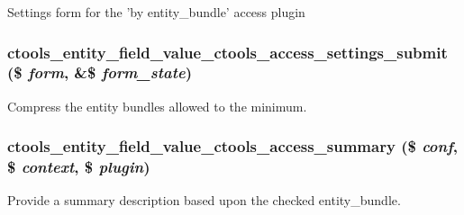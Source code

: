 \label{entity__field__value_8inc_a6de8332631f237ef4baaacc10ce923fc}
Settings form for the 'by entity\_\-bundle' access plugin \hypertarget{entity__field__value_8inc_a8af33147764d3a5269cf91065f0ad712}{
\subsubsection[{ctools\_\-entity\_\-field\_\-value\_\-ctools\_\-access\_\-settings\_\-submit}]{\setlength{\rightskip}{0pt plus 5cm}ctools\_\-entity\_\-field\_\-value\_\-ctools\_\-access\_\-settings\_\-submit (\$ {\em form}, \/  \&\$ {\em form\_\-state})}}
\label{entity__field__value_8inc_a8af33147764d3a5269cf91065f0ad712}
Compress the entity bundles allowed to the minimum. \hypertarget{entity__field__value_8inc_ad084c59021feb9bfa727b3c62476ccf7}{
\subsubsection[{ctools\_\-entity\_\-field\_\-value\_\-ctools\_\-access\_\-summary}]{\setlength{\rightskip}{0pt plus 5cm}ctools\_\-entity\_\-field\_\-value\_\-ctools\_\-access\_\-summary (\$ {\em conf}, \/  \$ {\em context}, \/  \$ {\em plugin})}}
\label{entity__field__value_8inc_ad084c59021feb9bfa727b3c62476ccf7}
Provide a summary description based upon the checked entity\_\-bundle. 

